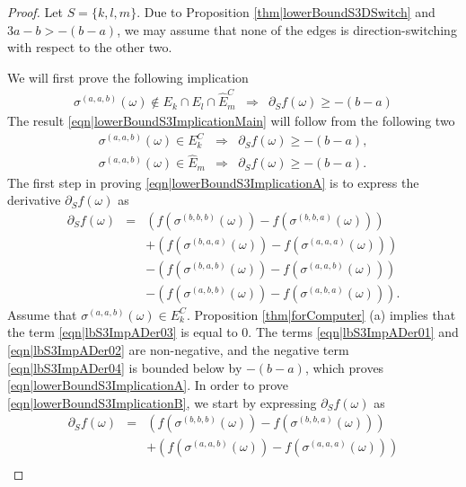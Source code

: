 \documentclass[10pt,a4paper]{amsart}
\begin{document}
\begin{proof} Let $S=\{k,l,m\}$. Due to Proposition \ref{thm|lowerBoundS3DSwitch} and $3a-b> -(b-a)$, we may assume that none of the edges is direction-switching with respect to the other two. 

We will first prove the following implication
\begin{eqnarray}
\sigma^{(a,a,b)}(\omega)\not\in E_k\cap E_l\cap \hat E_m^C&\Longrightarrow& \partial_Sf(\omega)\geq -(b-a)
\label{eqn|lowerBoundS3ImplicationMain}
\end{eqnarray}
The result \eqref{eqn|lowerBoundS3ImplicationMain} will follow from the following two
\begin{eqnarray}
\sigma^{(a,a,b)}(\omega)\in E_k^C &\Longrightarrow& \partial_Sf(\omega)\geq -(b-a),\label{eqn|lowerBoundS3ImplicationA}\\
\sigma^{(a,a,b)}(\omega)\in \hat E_m &\Longrightarrow& \partial_Sf(\omega)\geq -(b-a).\label{eqn|lowerBoundS3ImplicationB}
\end{eqnarray}
The first step in proving \eqref{eqn|lowerBoundS3ImplicationA} is to express the derivative $\partial_Sf(\omega)$ 
as 
\begin{eqnarray}
\partial_Sf(\omega)&=& \left(f(\sigma^{(b,b,b)}(\omega))-f(\sigma^{(b,b,a)}(\omega))\right) \label{eqn|lbS3ImpADer01}\\
&& +\left(f(\sigma^{(b,a,a)}(\omega))-
f(\sigma^{(a,a,a)}(\omega))\right) \label{eqn|lbS3ImpADer02}\\
&&-\left(f(\sigma^{(b,a,b)}(\omega))-f(\sigma^{(a,a,b)}(\omega))\right) \label{eqn|lbS3ImpADer03}\\
&&-\left(f(\sigma^{(a,b,b)}(\omega))-f(\sigma^{(a,b,a)}(\omega))
\right). \label{eqn|lbS3ImpADer04}
\end{eqnarray}
Assume that $\sigma^{(a,a,b)}(\omega)\in E_k^C$. Proposition \ref{thm|forComputer} (a) implies that the term \eqref{eqn|lbS3ImpADer03} 
is equal to $0$. The terms \eqref{eqn|lbS3ImpADer01} and \eqref{eqn|lbS3ImpADer02} are non-negative, and the negative term \eqref{eqn|lbS3ImpADer04} is bounded below
by $-(b-a)$, which proves \eqref{eqn|lowerBoundS3ImplicationA}.
In order to prove \eqref{eqn|lowerBoundS3ImplicationB}, we start by expressing $\partial_Sf(\omega)$ as 
\begin{eqnarray}
\partial_Sf(\omega)&=& \left(f(\sigma^{(b,b,b)}(\omega))-f(\sigma^{(b,b,a)}(\omega))\right) \label{eqn|lbS3ImpBDer01}\\
&& +\left(f(\sigma^{(a,a,b)}(\omega))-
f(\sigma^{(a,a,a)}(\omega))\right) \label{eqn|lbS3ImpBDer02}\\

\end{eqnarray}
\end{proof}
\end{document}
